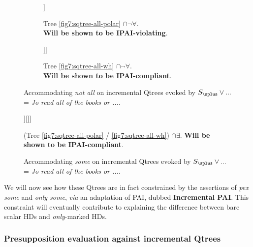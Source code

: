 \begin{figure}[H]
	\centering
	\begin{subfigure}[b]{.45\linewidth}
		\centering
		\begin{forest}
			[{CS$\cap\neg\forall$}[?,roof]]
		\end{forest}
		\caption[]{Tree \ref{fig7:sqtree-all-polar} $\cap\neg\forall$.\\ \textbf{Will be shown to be IPAI-violating}.}\label{fig7:sqtree-all-polar-inter-notall}
	\end{subfigure}
	\hfill
	\begin{subfigure}[b]{.45\linewidth}
		\centering
		\begin{forest}
			[{CS$\cap\neg\forall$}[$\neg\exists$][$\exists\wedge\neg\forall$[?, roof]]]
		\end{forest}
		\caption[]{Tree \ref{fig7:sqtree-all-wh} $\cap\neg\forall$.\\ \textbf{Will be shown to be IPAI-compliant}.}\label{fig7:sqtree-all-wh-inter-notall}
	\end{subfigure}
	\caption[]{Accommodating \textit{not all} on incremental Qtrees evoked by $S_{\splus} \vee ...$ = \textit{Jo read all of the books or ...}. }\label{fig7:sqtrees-all-inter-notall}
\end{figure}

\begin{figure}[H]
	\centering
	\begin{forest}
		[{CS$\cap\exists$}[$\exists\wedge\neg\forall$[?,roof]][\fbox{$\forall$}]]
	\end{forest}
	\caption[]{(Tree \ref{fig7:sqtree-all-polar} / \ref{fig7:sqtree-all-wh}) $\cap\exists$. \textbf{Will be shown to be IPAI-compliant}.}\label{fig7:sqtree-all-polar-inter-some}
	\caption[]{Accommodating \textit{some} on incremental Qtrees evoked by $S_{\splus} \vee ...$ = \textit{Jo read all of the books or ...}. }\label{fig7:sqtrees-all-inter-some}
\end{figure}

We will now see how these Qtrees are in fact constrained by the assertions of \textit{pex some} and \textit{only some}, \textit{via} an adaptation of PAI, dubbed \textbf{Incremental PAI}. This constraint will eventually contribute to explaining the difference between bare scalar HDs and \textit{only}-marked HDs.

\subsubsection{Presupposition evaluation against incremental Qtrees}


